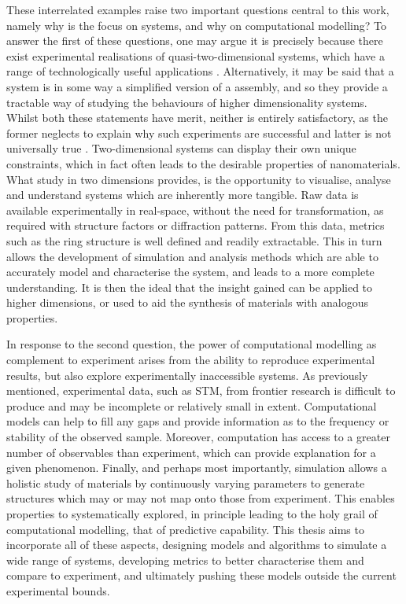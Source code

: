 These interrelated examples raise two important questions central to this work, namely why is the focus on \td{} systems, and why on computational modelling?
To answer the first of these questions, one may argue it is precisely because there exist experimental realisations of quasi\--two\--dimensional systems, which have a range of technologically useful applications \cite{Butler2013,Bhimanapati2015,Tan2017}.
Alternatively, it may be said that a \td{} system is in some way a simplified version of a \thd{} assembly, and so they provide a tractable way of studying the behaviours of higher dimensionality systems.
Whilst both these statements have merit, neither is entirely satisfactory, as the former neglects to explain why such experiments are successful and latter is not universally true \cite{ChaikinPaulM1995}.
Two\--dimensional systems can display their own unique constraints, which in fact often leads to the desirable properties of nanomaterials.
What study in two dimensions provides, is the opportunity to visualise, analyse and understand systems which are inherently more tangible.
Raw data is available experimentally in real\--space, without the need for transformation, as required with structure factors or diffraction patterns.
From this data, metrics such as the ring structure is well defined and readily extractable.
This in turn allows the development of simulation and analysis methods which are able to accurately model and characterise the system, and leads to a more complete understanding.
It is then the ideal that the insight gained can be applied to higher dimensions, or used to aid the synthesis of materials with analogous properties.

In response to the second question, the power of computational modelling as complement to experiment arises from the ability to reproduce experimental results, but also explore experimentally inaccessible systems.
As previously mentioned, experimental data, such as STM, from frontier research is difficult to produce and may be incomplete or relatively small in extent.
Computational models can help to fill any gaps and provide information as to the frequency or stability of the observed sample.
Moreover, computation has access to a greater number of observables than experiment, which can provide explanation for a given phenomenon.
Finally, and perhaps most importantly, simulation allows a holistic study of materials by continuously varying parameters to generate structures which may or may not map onto those from experiment.
This enables properties to systematically explored, in principle leading to the holy grail of computational modelling, that of predictive capability.
This thesis aims to incorporate all of these aspects, designing models and algorithms to simulate a wide range of \td{} systems, developing metrics to better characterise them and compare to experiment, and ultimately pushing these models outside the current experimental bounds.  

